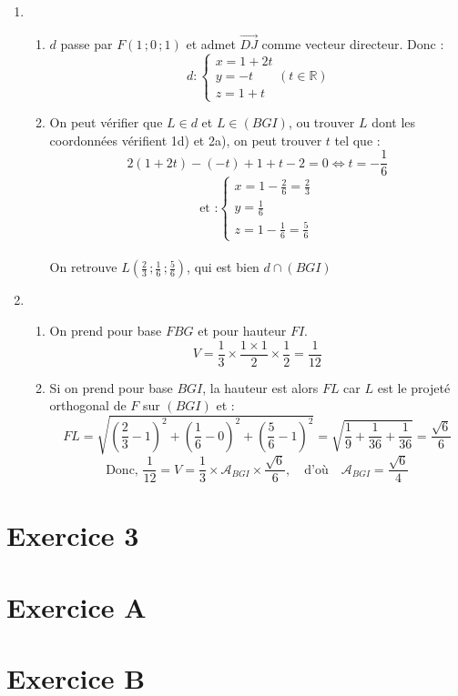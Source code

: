 \documentclass{scrartcl}
\begin{document}
\begin{adjustwidth}{2em}{0pt}
\begin{enumerate}
\begin{enumerate}[label=\alph*)]
            \end{enumerate}
            \item \begin{enumerate}[label=\alph*)]
                \item   $d$ passe par $F(1\,;0\,;1)$ et admet $\overrightarrow{DJ}$ comme vecteur directeur. Donc : \[d:\begin{cases}
                    x=1+2t \\ y=-t \\ z=1+t
                \end{cases} (t\in{\mathbb{R}})\]
                \item On peut vérifier que $L\in d$ et $L\in(BGI)$, ou trouver $L$ dont les coordonnées vérifient 1d) et 2a), on peut trouver $t$ tel que : \[2(1+2t)-(-t)+1+t-2=0\iff t=-\frac{1}{6}\]  \[\text{et :}\begin{cases}
                    x=1-\frac{2}{6}=\frac{2}{3} \\ y=\frac{1}{6} \\ z=1-\frac{1}{6}=\frac{5}{6}
                \end{cases}\] \\
                On retrouve $L\left(\frac{2}{3}\,;\frac{1}{6}\,;\frac{5}{6}\right)$, qui est bien $d\cap(BGI)$
            \end{enumerate}
            \item \begin{enumerate}[label=\alph*)]
                \item On prend pour base $FBG$ et pour hauteur $FI$. \[V=\frac{1}{3}\times\frac{1\times 1}{2}\times\frac{1}{2}=\frac{1}{12}\]
                \item Si on prend pour base $BGI$, la hauteur est alors $FL$ car $L$ est le projeté orthogonal de $F$ sur $(BGI)$ et : \[FL=\sqrt{\left(\frac{2}{3}-1\right)^2+\left(\frac{1}{6}-0\right)^2+\left(\frac{5}{6}-1\right)^2}=\sqrt{\frac{1}{9}+\frac{1}{36}+\frac{1}{36}}=\frac{\sqrt{6}}{6}\] \[\text{Donc, }\frac{1}{12}=V=\frac{1}{3}\times\mathcal{A}_{BGI}\times\frac{\sqrt{6}}{6},\quad\text{d'où}\quad\mathcal{A}_{BGI}=\frac{\sqrt{6}}{4}\]
            \end{enumerate}
        \end{enumerate}
    \end{adjustwidth}
    \section*{Exercice 3}
    \begin{adjustwidth}{2em}{0pt}
        
    \end{adjustwidth}
    \section*{Exercice A}
    \begin{adjustwidth}{2em}{0pt}
        
    \end{adjustwidth}
    \section*{Exercice B}
\end{document}

